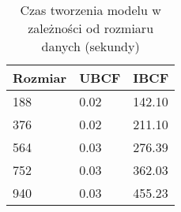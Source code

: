 \begin{table}[ht]
	\centering
    \begin{tabular}{lll}
    Rozmiar & UBCF & IBCF   \\
    \hline
    188     & 0.02 & 142.10 \\
    376     & 0.02 & 211.10 \\
    564     & 0.03 & 276.39 \\
    752     & 0.03 & 362.03 \\
    940     & 0.03 & 455.23 \\
    \end{tabular}
	\caption{Czas tworzenia modelu w zależności od rozmiaru danych (sekundy)} 
\end{table}